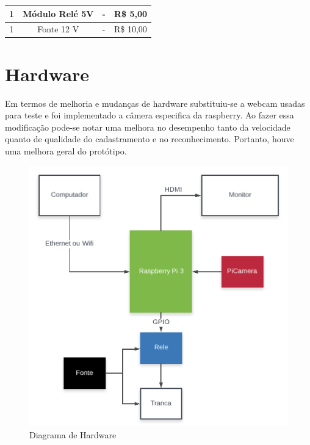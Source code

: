 \documentclass[conference,compsoc]{IEEEtran}
\begin{document}
\begin{table}[!ht]
\begin{tabular}{|c|c|c|c|}
{\color[HTML]{000000} 1}            & {\color[HTML]{000000} Módulo Relé 5V}                                                                & {\color[HTML]{000000} -}                   & {\color[HTML]{000000} R\$ 5,00}       \\ \hline
{\color[HTML]{000000} 1}            & {\color[HTML]{000000} Fonte 12 V}                                                                    & {\color[HTML]{000000} -}                   & {\color[HTML]{000000} R\$ 10,00}      \\ \hline
\end{tabular}
\end{table}

 
 \section{Hardware}
 
Em termos de melhoria e mudanças de hardware substituiu-se a webcam usadas para teste e foi implementado a câmera especifica da raspberry. Ao fazer essa modificação pode-se notar uma melhora no desempenho tanto da velocidade quanto de qualidade do cadastramento e no reconhecimento. Portanto, houve uma melhora geral do protótipo.   
 
 \begin{figure}[!ht]
		\centering
		\includegraphics[scale=0.25]{diagrama_de_hardware.png}
		\caption{Diagrama de Hardware}
\end{figure}
\end{document}
